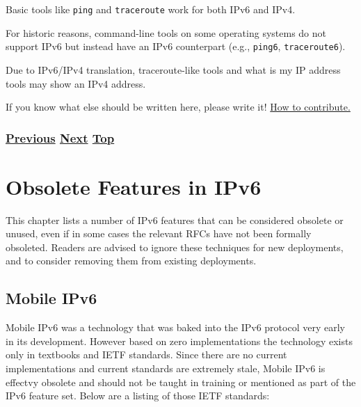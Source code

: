 \documentclass[
]{article}
\begin{document}
Basic tools like \texttt{ping} and \texttt{traceroute} work for both
IPv6 and IPv4.

For historic reasons, command-line tools on some operating systems do
not support IPv6 but instead have an IPv6 counterpart (e.g.,
\texttt{ping6}, \texttt{traceroute6}).

Due to IPv6/IPv4 translation, traceroute-like tools and
\textquotesingle what is my IP address\textquotesingle{} tools may show
an IPv4 address.

If you know what else should be written here, please write it!
\href{https://github.com/becarpenter/book6/blob/main/1.\%20Introduction\%20and\%20Foreword/How\%20to\%20contribute.md\#how-to-contribute}{How
to contribute.}

\subsubsection{\texorpdfstring{\hyperref[advanced-troubleshooting]{Previous}
\hyperref[obsolete-features-in-ipv6]{Next}
\hyperref[troubleshooting]{Top}}{Previous Next Top}}\label{previous-next-top-38}

\pagebreak

\section{Obsolete Features in IPv6}\label{obsolete-features-in-ipv6}

This chapter lists a number of IPv6 features that can be considered
obsolete or unused, even if in some cases the relevant RFCs have not
been formally obsoleted. Readers are advised to ignore these techniques
for new deployments, and to consider removing them from existing
deployments.

\subsection{Mobile IPv6}\label{mobile-ipv6}

Mobile IPv6 was a technology that was baked into the IPv6 protocol very
early in its development. However based on zero implementations the
technology exists only in textbooks and IETF standards. Since there are
no current implementations and current standards are extremely stale,
Mobile IPv6 is effectvy obsolete and should not be taught in training or
mentioned as part of the IPv6 feature set. Below are a listing of those
IETF standards:
\end{document}
